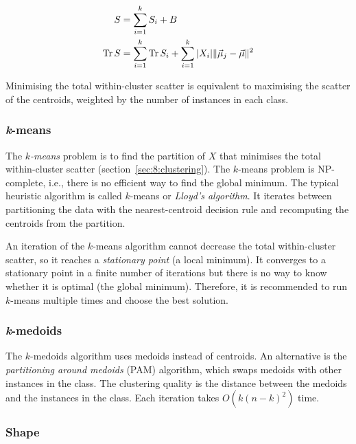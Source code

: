 \begin{thm}
  \begin{align}
    S
     & = \sum_{i = 1}^{k} S_i + B \\
    \operatorname{Tr} S
     & = \sum_{i = 1}^{k} \operatorname{Tr} S_i +
    \sum_{i = 1}^{k} |X_i| \lVert \vec{\mu}_j - \vec{\mu} \rVert^2
  \end{align}
\end{thm}

Minimising the total within-cluster scatter is equivalent to maximising the
scatter of the centroids, weighted by the number of instances in each class.

\subsubsection{\textit{k}-means}

The \textit{$k$-means} problem is to find the partition of $X$ that minimises
the total within-cluster scatter (section~\ref{sec:8:clustering}).
The $k$-means problem is NP-complete, i.e., there is no efficient way to find
the global minimum.
The typical heuristic algorithm is called $k$-means or
\textit{Lloyd's algorithm}.
It iterates between partitioning the data with the nearest-centroid decision
rule and recomputing the centroids from the partition.

An iteration of the $k$-means algorithm cannot decrease the total within-cluster
scatter, so it reaches a \textit{stationary point} (a local minimum).
It converges to a stationary point in a finite number of iterations but there is
no way to know whether it is optimal (the global minimum).
Therefore, it is recommended to run $k$-means multiple times and choose the
best solution.

\subsubsection{\textit{k}-medoids}

The $k$-medoids algorithm uses medoids instead of centroids.
An alternative is the \textit{partitioning around medoids} (PAM) algorithm,
which swaps medoids with other instances in the class.
The clustering quality is the distance between the medoids and the instances in
the class.
Each iteration takes $O(k(n - k)^2)$ time.

\subsubsection{Shape}

